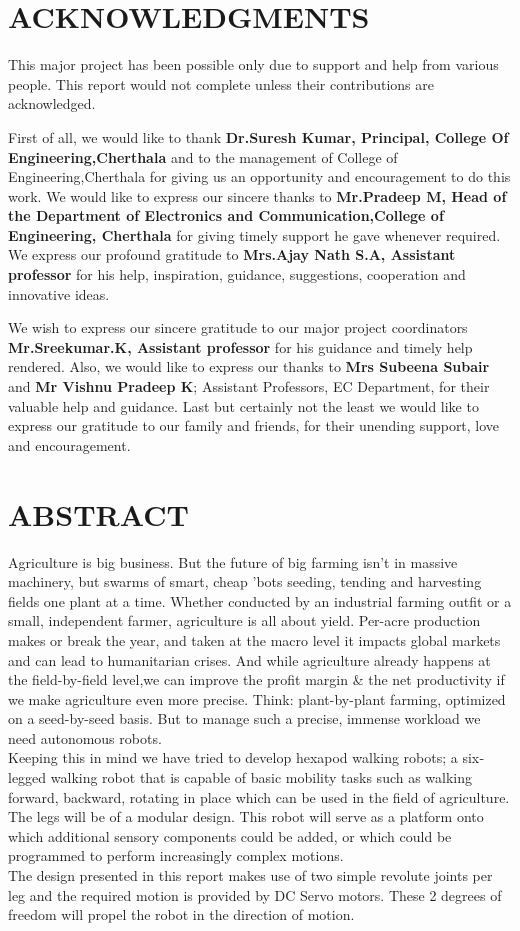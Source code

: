 \documentclass{report}
\begin{document}
\chapter*{ACKNOWLEDGMENTS}
This major project has been possible only due to support and help from various people. This report would not complete unless their contributions are acknowledged.

	First of all, we would like to thank \textbf{Dr.Suresh Kumar, Principal, College Of Engineering,Cherthala} and to the management of College of Engineering,Cherthala for giving us an opportunity and encouragement to do this work. We would like to express our sincere thanks to \textbf{Mr.Pradeep M, Head of the Department of Electronics and Communication,College of Engineering, Cherthala} for giving timely support he gave whenever required. We express our profound gratitude to \textbf{Mrs.Ajay Nath S.A, Assistant professor} for his help, inspiration, guidance, suggestions, cooperation and innovative ideas.

We wish to express our sincere gratitude to our major project coordinators \textbf{Mr.Sreekumar.K, Assistant professor} for his guidance and timely help rendered. Also, we would like to express our thanks to \textbf{Mrs Subeena Subair} and \textbf{Mr Vishnu Pradeep K}; Assistant Professors, EC Department, for their valuable help and guidance. Last but certainly not the least we would like to express our gratitude to our family and friends, for their unending support, love and encouragement.


\chapter*{ABSTRACT}
Agriculture is big business. But the future of big farming isn’t in massive machinery, but swarms of smart, cheap 'bots seeding, tending and harvesting fields one plant at a time. Whether conducted by an industrial farming outfit or a small, independent farmer, agriculture is all about yield. Per-acre production makes or break the year, and taken at the macro level it impacts global markets and can lead to humanitarian crises. And while agriculture already happens at the field-by-field level,we can improve the profit margin \& the net productivity if we make agriculture even more precise. Think: plant-by-plant farming, optimized on a seed-by-seed basis.
But to manage such a precise, immense workload we need autonomous robots.\\
Keeping this in mind we have tried to develop hexapod walking robots; a six‐legged walking robot that is capable of basic mobility tasks such as
walking forward, backward, rotating in place which can be used in the field of agriculture.
The legs will be of a modular design. This robot will serve as a platform onto which additional sensory components could be added, or which could be programmed to perform increasingly complex motions.\\
The design presented in this report makes use of two simple revolute joints per leg and the required motion is provided by DC Servo motors. These 2 degrees of freedom will propel the robot in the direction of motion.
\listoffigures
\tableofcontents
\end{document}
